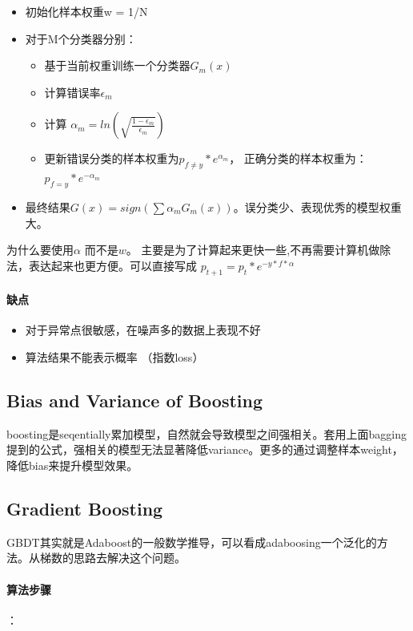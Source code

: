 \documentclass[12pt,a4paper,oneside]{article}
\begin{document}
\begin{CJK*}{UTF8}{gbsn}
\begin{itemize}
\item 初始化样本权重w = 1/N
\item 对于M个分类器分别： 
\begin{itemize}
\item 基于当前权重训练一个分类器$G_{m}(x)$
\item 计算错误率$\epsilon_{m}$
\item 计算 $\alpha_{m} = ln\left( \sqrt{\frac{1-\epsilon_{m}}{\epsilon_{m}}} \right)$
\item 更新错误分类的样本权重为$ p_{f\neq y }* e^{\alpha_{m}}$， 正确分类的样本权重为：$p_{f= y}* e^{- \alpha_{m}}$
\end{itemize}
\item 最终结果$G(x)=sign(\sum \alpha_{m} G_{m}(x))$。误分类少、表现优秀的模型权重大。
\end{itemize}

为什么要使用$\alpha$ 而不是$w$。 主要是为了计算起来更快一些,不再需要计算机做除法，表达起来也更方便。可以直接写成 $p_{t+1}=p_{t}*e^{-y*f*\alpha}$

\paragraph{缺点}

\begin{itemize}
\item 对于异常点很敏感，在噪声多的数据上表现不好
\item 算法结果不能表示概率 （指数loss）
\end{itemize}

\subsection{Bias and Variance of Boosting}
boosting是seqentially累加模型，自然就会导致模型之间强相关。套用上面bagging提到的公式，强相关的模型无法显著降低variance。更多的通过调整样本weight，降低bias来提升模型效果。


\subsection{Gradient Boosting}
GBDT其实就是Adaboost的一般数学推导，可以看成adaboosing一个泛化的方法。从梯数的思路去解决这个问题。

\paragraph{算法步骤}：
\newline


\end{CJK*}
\end{document}
